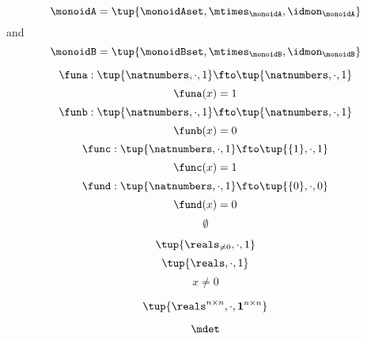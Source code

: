 \begin{forslides}
 \begin{equation}\label{eq:monoidA}
  \monoidA = \tup{\monoidAset, \mtimes_\monoidA, \idmon_\monoidA}
   \end{equation}
   and
   \begin{equation}\label{eq:monoidB}
   \monoidB = \tup{\monoidBset, \mtimes_\monoidB, \idmon_\monoidB}
   \end{equation}

   \begin{equation} \label{eq:quiz-1}
   \funa: \tup{\natnumbers, \cdot, 1} \fto \tup{\natnumbers, \cdot, 1}
   \end{equation}
   \begin{equation} \label{eq:quiz-1-def}
   \funa(x) = 1
   \end{equation}
   \begin{equation} \label{eq:quiz-2}
   \funb: \tup{\natnumbers, \cdot, 1} \fto \tup{\natnumbers, \cdot, 1}
   \end{equation}
   \begin{equation} \label{eq:quiz-2-def}
   \funb(x) = 0
   \end{equation}
    \begin{equation} \label{eq:quiz-3}
   \func: \tup{\natnumbers, \cdot, 1} \fto \tup{\{1\}, \cdot, 1}
   \end{equation}
   \begin{equation} \label{eq:quiz-3-def}
   \func(x) = 1
   \end{equation}
   \begin{equation} \label{eq:quiz-4}
   \fund: \tup{\natnumbers, \cdot, 1} \fto \tup{\{0\}, \cdot, 0}
   \end{equation}
   \begin{equation} \label{eq:quiz-4-def}
   \fund(x) = 0
   \end{equation}
      \begin{equation} \label{eq:emptyset}
   \emptyset
   \end{equation}

   \begin{equation} \label{eq:nonzeroreals-times}
   \tup{\reals_{\neq0}, \cdot, 1}
   \end{equation}
   \begin{equation} \label{eq:reals-times-one}
   \tup{\reals , \cdot, 1}
   \end{equation}
   \begin{equation} \label{eq:reals-times-one-non}
   x \neq 0
   \end{equation}

   \begin{equation} \label{eq:matrices-times}
   \tup{\reals^{n\times n}, \cdot, \mathbf{1}^{n\times n}}
   \end{equation}

   \begin{equation} \label{eq:det}
   \mdet
   \end{equation}
\end{forslides}


